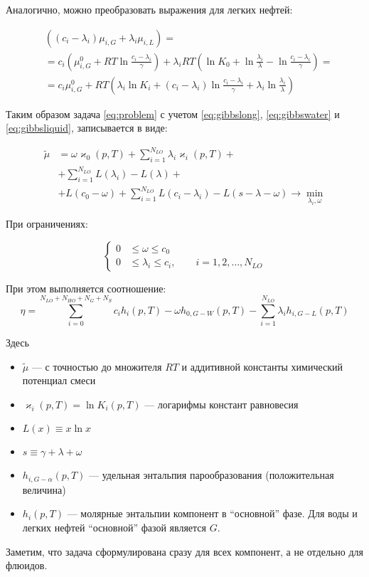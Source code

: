 \documentclass[12pt]{article}
\begin{document}
Аналогично, можно преобразовать выражения для легких нефтей:

\begin{equation}
\begin{aligned}
& \left((c_i - \lambda_i) \mu_{i, G} + \lambda_i \mu_{i, L}\right) = \\
& = c_i \left(\mu_{i, G}^0 + RT \ln \frac{c_i - \lambda_i}{\gamma} \right) + \lambda_i RT \left(\ln K_0 + \ln \frac{\lambda_i}{\lambda} - \ln \frac{c_i - \lambda_i}{\gamma}\right) = \\
& = c_i \mu_{i, G}^0 + RT \left(\lambda_i \ln K_i + (c_i - \lambda_i)\ln \frac{c_i - \lambda_i}{\gamma} + \lambda_i \ln \frac{\lambda_i}{\lambda} \right)
\end{aligned}
\label{eq:gibbsliquid}
\end{equation}

Таким образом задача \eqref{eq:problem} с учетом \eqref{eq:gibbslong}, \eqref{eq:gibbswater} и \eqref{eq:gibbsliquid}, записывается в виде:

\begin{equation}
\begin{aligned}
\tilde{\mu} &= \omega \varkappa_0(p,T) + \sum_{i=1}^{N_{LO}} \lambda_i \varkappa_i(p,T) + \\
&+ \sum_{i=1}^{N_{LO}} L(\lambda_i) - L(\lambda) + \\
&+ L(c_0 - \omega) + \sum_{i=1}^{N_{LO}} L(c_i - \lambda_i) - L(s - \lambda - \omega) \rightarrow \min_{\lambda_i, \omega}
\end{aligned}
\end{equation}

При ограничениях:

\[
\left\{
\begin{aligned}
0& \leq \omega \leq c_0\\
0& \leq \lambda_i \leq c_i, \qquad i = 1,2,\dots,N_{LO}
\end{aligned}
\right.
\]

При этом выполняется соотношение:
\[
\eta = 
\sum_{i=0}^{N_{LO}+N_{HO}+N_{G}+N_{S}} c_i h_i(p,T) -\omega h_{0,G-W}(p,T) -\sum_{i=1}^{N_{LO}} \lambda_i h_{i,G-L}(p,T) 
\]

Здесь
\begin{itemize}
\item $\tilde{\mu}$ --- с точностью до множителя $RT$ и аддитивной константы химический потенциал смеси
\item $\varkappa_i(p, T) = \ln K_i(p, T)$ --- логарифмы констант равновесия
\item $L(x) \equiv x \ln x$
\item $s \equiv \gamma + \lambda + \omega$
\item $h_{i,G-\alpha}(p,T)$ --- удельная энтальпия парообразования (положительная величина)
\item $h_i(p,T)$ --- молярные энтальпии компонент в ``основной'' фазе. Для воды и легких нефтей ``основной'' фазой является $G$.
\end{itemize}

Заметим, что задача сформулирована сразу для всех компонент, а не отдельно для
флюидов.
\end{document}
